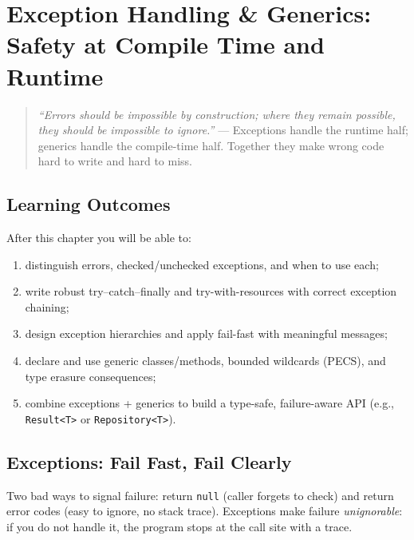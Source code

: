 \chapter{Exception Handling \& Generics: Safety at Compile Time and Runtime}
\label{ch:exceptions-generics}

\begin{quote}
\emph{``Errors should be impossible by construction; where they remain possible, they should be impossible to ignore.''} --- Exceptions handle the runtime half; generics handle the compile-time half. Together they make wrong code hard to write and hard to miss.
\end{quote}

\noindent{}
\vspace{0.4em}

\section*{Learning Outcomes}
After this chapter you will be able to:
\begin{enumerate}[label=(L\arabic*)]
    \item distinguish errors, checked/unchecked exceptions, and when to use each;
    \item write robust try--catch--finally and try-with-resources with correct exception chaining;
    \item design exception hierarchies and apply fail-fast with meaningful messages;
    \item declare and use generic classes/methods, bounded wildcards (PECS), and type erasure consequences;
    \item combine exceptions + generics to build a type-safe, failure-aware API (e.g., \texttt{Result<T>} or \texttt{Repository<T>}).
\end{enumerate}

\section{Exceptions: Fail Fast, Fail Clearly}
\label{sec:exceptions}
Two bad ways to signal failure: return \texttt{null} (caller forgets to check) and return error codes (easy to ignore, no stack trace). Exceptions make failure \emph{unignorable}: if you do not handle it, the program stops at the call site with a trace.

